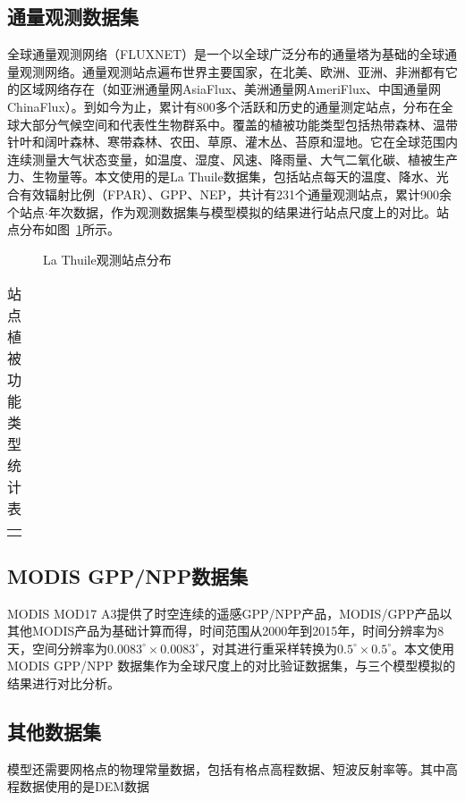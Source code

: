 \subsection{通量观测数据集}
全球通量观测网络（FLUXNET）是一个以全球广泛分布的通量塔为基础的全球通量观测网络。通量观测站点遍布世界主要国家，在北美、欧洲、亚洲、非洲都有它的区域网络存在（如亚洲通量网AsiaFlux、美洲通量网AmeriFlux、中国通量网ChinaFlux）。到如今为止，累计有800多个活跃和历史的通量测定站点，分布在全球大部分气候空间和代表性生物群系中。覆盖的植被功能类型包括热带森林、温带针叶和阔叶森林、寒带森林、农田、草原、灌木丛、苔原和湿地。它在全球范围内连续测量大气状态变量，如温度、湿度、风速、降雨量、大气二氧化碳、植被生产力、生物量等。本文使用的是La Thuile数据集，包括站点每天的温度、降水、光合有效辐射比例（FPAR）、GPP、NEP，共计有231个通量观测站点，累计900余个站点$\cdot$年次数据，作为观测数据集与模型模拟的结果进行站点尺度上的对比。站点分布如图~\ref{fig:Thuile-site-POI}所示。

\begin{figure}[!htbp]
    \centering
    \caption{La Thuile观测站点分布}
    \label{fig:Thuile-site-POI}
\end{figure}

\begin{table}[!htbp]
    \centering
    \caption{站点植被功能类型统计表}
    \label{tab:site-PFT-stat}
    \begin{threeparttable}
        \begin{tabular}{c}
            \Xhline{1.5pt} 
            \Xhline{1.5pt}
            \Xhline{1.5pt}
        \end{tabular}
    \end{threeparttable}
\end{table}

\subsection{MODIS GPP/NPP数据集}
MODIS MOD17 A3提供了时空连续的遥感GPP/NPP产品，MODIS/GPP产品以其他MODIS产品为基础计算而得，时间范围从2000年到2015年，时间分辨率为8天，空间分辨率为$0.0083^{\circ} \times 0.0083^{\circ}$，对其进行重采样转换为$0.5^{\circ} \times 0.5^{\circ}$。本文使用MODIS GPP/NPP 数据集作为全球尺度上的对比验证数据集，与三个模型模拟的结果进行对比分析。

\subsection{其他数据集}
模型还需要网格点的物理常量数据，包括有格点高程数据、短波反射率等。其中高程数据使用的是DEM数据

